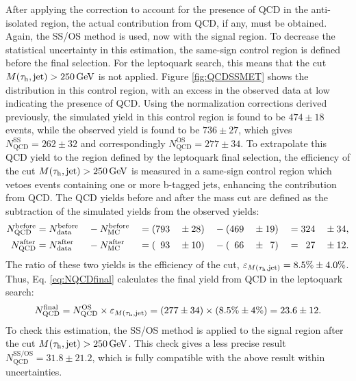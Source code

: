 After applying the correction to account for the presence of QCD in the anti-isolated region, the actual contribution from QCD, if any, must be obtained. Again, the SS/OS method is used, now with the signal region. To decrease the statistical uncertainty in this estimation, the same-sign control region is defined before the final selection. For the leptoquark search, this means that the cut $M(\tau_{\text{h}},\text{jet})>250\,\text{Ge\hspace{-.08em}V}$ is not applied. Figure \ref{fig:QCDSSMET} shows the \met distribution in this control region, with an excess in the observed data at low \met indicating the presence of QCD. Using the normalization corrections derived previously, the simulated yield in this control region is found to be $474\pm18$ events, while the observed yield is found to be $736\pm27$, which gives $N_{\text{QCD}}^{\text{SS}} = 262\pm32$ and correspondingly $N_{\text{QCD}}^{\text{OS}} = 277\pm34$. To extrapolate this QCD yield to the region defined by the leptoquark final selection, the efficiency of the cut $M(\tau_{\text{h}},\text{jet})>250\,\text{Ge\hspace{-.08em}V}$ is measured in a same-sign control region which vetoes events containing one or more b-tagged jets, enhancing the contribution from QCD. The QCD yields before and after the mass cut are defined as the subtraction of the simulated yields from the observed yields:
\begin{alignat}{8}
N_{\text{QCD}}^{\text{before}} &= N_{\text{data}}^{\text{before}} &&- N_{\text{MC}}^{\text{before}} &&= (793 &&\pm 28) &&- (469 &&\pm 19) &&= 324 &&\pm 34, \\
N_{\text{QCD}}^{\text{after}} &= N_{\text{data}}^{\text{after}}   &&- N_{\text{MC}}^{\text{after}}  &&= (\hphantom{7}93  &&\pm 10) &&- (\hphantom{4}66  &&\pm \hphantom{1}7)  &&= \hphantom{3}27  &&\pm 12.
\end{alignat}
The ratio of these two yields is the efficiency of the cut, $\varepsilon_{M(\tau_{\text{h}},\text{jet})}=8.5\%\pm4.0\%$. Thus, Eq. \eqref{eq:NQCDfinal} calculates the final yield from QCD in the leptoquark search:
\begin{equation}
N_{\text{QCD}}^{\text{final}} = N_{\text{QCD}}^{\text{OS}} \times \varepsilon_{M(\tau_{\text{h}},\text{jet})} = (277\pm 34) \times (8.5\% \pm 4\%) = 23.6 \pm 12. \label{eq:NQCDfinal}
\end{equation}
To check this estimation, the SS/OS method is applied to the signal region after the cut $M(\tau_{\text{h}},\text{jet})>250\,\text{Ge\hspace{-.08em}V}$. This check gives a less precise result $N_{\text{QCD}}^{\text{SS/OS}} = 31.8 \pm 21.2$, which is fully compatible with the above result within uncertainties.


